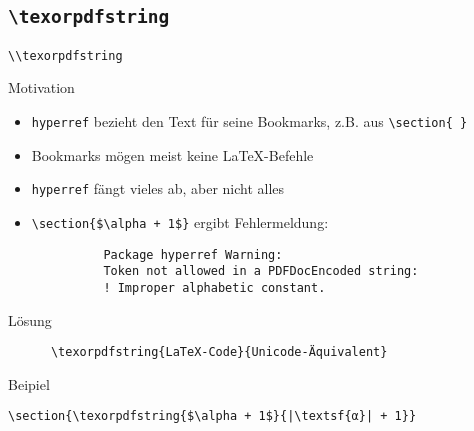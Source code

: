 \subsection{\texttt{\textbackslash texorpdfstring}}

\begin{frame}[fragile]{\lstinline[texcsstyle=*\color{white}]+\\texorpdfstring+}
  \begin{block}{Motivation}
    \begin{itemize}
      \item \texttt{hyperref} bezieht den Text für seine Bookmarks, z.B. aus \lstinline+\section{ }+
      \item[→] Bookmarks mögen meist keine \LaTeX-Befehle
      \item \texttt{hyperref} fängt vieles ab, aber nicht alles
      \item
        \lstinline!\section{$\alpha + 1$}! ergibt Fehlermeldung:
        \begin{lstlisting}
          Package hyperref Warning:
          Token not allowed in a PDFDocEncoded string:
          ! Improper alphabetic constant.
        \end{lstlisting}
    \end{itemize}
  \end{block}
  \begin{block}{Lösung}
    \begin{lstlisting}
      \texorpdfstring{LaTeX-Code}{Unicode-Äquivalent}
    \end{lstlisting}
  \end{block}
  \begin{block}{Beipiel}
    \begin{lstlisting}[escapechar=|]
      \section{\texorpdfstring{$\alpha + 1$}{|\textsf{α}| + 1}}
    \end{lstlisting}
  \end{block}
\end{frame}
